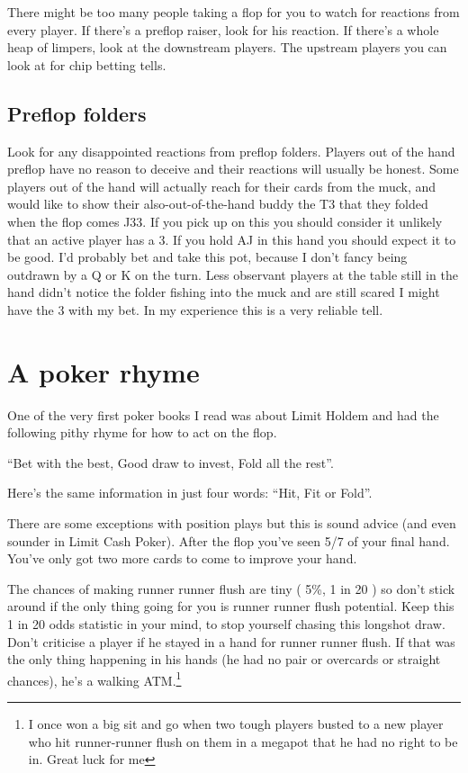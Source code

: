 There might be too many people taking a flop for you to watch for
reactions from every player. If there's a preflop raiser, look
for his reaction. If there's a whole heap of limpers,
look at the downstream players. The upstream players you can look at
for chip betting tells.

\subsection{Preflop folders}

Look for any disappointed reactions from preflop folders. Players
out of the hand preflop have no reason to deceive and their
reactions will usually be honest. Some players out of the hand
will actually reach for their cards from the muck, and would like
to show their also-out-of-the-hand buddy the T3 that they folded
when the flop comes J33. If you pick up on this you should consider
it unlikely that an active player has a 3. If you hold AJ in this
hand you should expect it to be good. I'd probably bet and take this
pot, because I don't fancy being outdrawn by a Q or K on the turn.
Less observant players at the table still in the hand didn't notice
the folder fishing into the muck and are still scared I might
have the 3 with my bet. In my experience this is a very reliable tell.

\section{A poker rhyme}

One of the very first poker books I read was about Limit Holdem and
had the following pithy rhyme for how to act on the flop.

``Bet with the best, Good draw to invest, Fold all the rest''.


Here's the same information in just four words: ``Hit, Fit or Fold''.

There are some exceptions with position plays but this is sound
advice (and even sounder in Limit Cash Poker). After the flop
you've seen 5/7 of your final hand. You've only got two
more cards to come to improve your hand.

The chances of making runner runner flush are tiny ( 5\%, 1 in 20 )
so don't stick around if the only thing going for you is runner
runner flush potential. Keep this 1 in 20 odds statistic in your
mind, to stop yourself chasing this longshot draw.
Don't criticise a player if he stayed in a hand for runner
runner flush. If that was the only thing happening in his hands
(he had no pair or overcards or straight chances), he's a walking
ATM.\footnote{I once won a big sit and go when two tough players
busted to a new player who hit runner-runner flush on them
in a megapot that he had no right to be in. Great luck for me}

